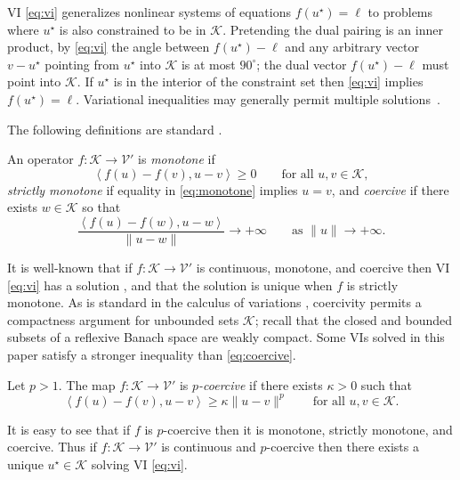 \documentclass[review,hidelinks,onefignum,onetabnum]{siamart220329}
\newcommand{\cK}{\mathcal{K}}
\newcommand{\cV}{\mathcal{V}}
\newcommand{\ip}[2]{\left<#1,#2\right>}
\begin{document}
VI \eqref{eq:vi} generalizes nonlinear systems of equations $f(u^\star)=\ell$ to problems where $u^\star$ is also constrained to be in $\cK$.  Pretending the dual pairing is an inner product, by \eqref{eq:vi} the angle between $f(u^\star)-\ell$ and any arbitrary vector $v-u^\star$ pointing from $u^\star$ into $\cK$ is at most $90^\circ$; the dual vector $f(u^\star)-\ell$ must point into $\cK$.  If $u^\star$ is in the interior of the constraint set then \eqref{eq:vi} implies $f(u^\star)=\ell$.
Variational inequalities may generally permit multiple solutions~\cite{Farrell2019}.

The following definitions are standard \cite{KinderlehrerStampacchia1980}.

\begin{definition}  An operator $f:\cK \to \cV'$ is \emph{monotone} if
\begin{equation}
\ip{f(u)-f(v)}{u-v} \ge 0 \qquad \text{for all } u,v \in \cK, \label{eq:monotone}
\end{equation}
\emph{strictly monotone} if equality in \eqref{eq:monotone} implies $u=v$, and \emph{coercive} if there exists $w \in \cK$ so that
\begin{equation}
\frac{\ip{f(u)-f(w)}{u-w}}{\|u-w\|} \to +\infty \qquad \text{as } \|u\|\to +\infty. \label{eq:coercive}
\end{equation}
\end{definition}

It is well-known that if $f:\cK \to \cV'$ is continuous, monotone, and coercive then VI \eqref{eq:vi} has a solution \cite[Corollary III.1.8]{KinderlehrerStampacchia1980}, and that the solution is unique when $f$ is strictly monotone.  As is standard in the calculus of variations \cite{Evans2010}, coercivity permits a compactness argument for unbounded sets $\cK$; recall that the closed and bounded subsets of a reflexive Banach space are weakly compact.  Some VIs solved in this paper satisfy a stronger inequality than \eqref{eq:coercive}.

\begin{definition}  Let $p>1$.  The map $f:\cK \to \cV'$ is \emph{$p$-coercive} if there exists $\kappa>0$ such that
\begin{equation}
\ip{f(u)-f(v)}{u-v} \ge \kappa \|u-v\|^p \qquad \text{for all } u,v \in \cK. \label{eq:pcoercive}
\end{equation}
\end{definition}

It is easy to see that if $f$ is $p$-coercive then it is monotone, strictly monotone, and coercive.  Thus if $f:\cK \to \cV'$ is continuous and $p$-coercive then there exists a unique $u^\star\in \cK$ solving VI \eqref{eq:vi}.
\end{document}
